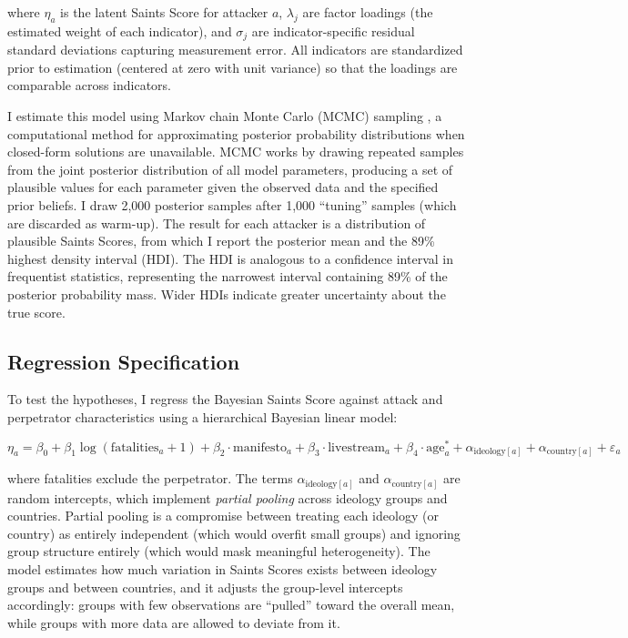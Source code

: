 \documentclass[12pt]{article}
\begin{document}
\noindent where $\eta_a$ is the latent Saints Score for attacker $a$, $\lambda_j$ are factor loadings (the estimated weight of each indicator), and $\sigma_j$ are indicator-specific residual standard deviations capturing measurement error. All indicators are standardized prior to estimation (centered at zero with unit variance) so that the loadings are comparable across indicators.

I estimate this model using Markov chain Monte Carlo (MCMC) sampling \parencite{gelman2013bayesian}, a computational method for approximating posterior probability distributions when closed-form solutions are unavailable. MCMC works by drawing repeated samples from the joint posterior distribution of all model parameters, producing a set of plausible values for each parameter given the observed data and the specified prior beliefs. I draw 2,000 posterior samples after 1,000 ``tuning'' samples (which are discarded as warm-up). The result for each attacker is a distribution of plausible Saints Scores, from which I report the posterior mean and the 89\% highest density interval (HDI). The HDI is analogous to a confidence interval in frequentist statistics, representing the narrowest interval containing 89\% of the posterior probability mass. Wider HDIs indicate greater uncertainty about the true score.

\subsection{Regression Specification}

To test the hypotheses, I regress the Bayesian Saints Score against attack and perpetrator characteristics using a hierarchical Bayesian linear model:

\begin{equation}
\eta_a = \beta_0 + \beta_1 \log(\text{fatalities}_a + 1) + \beta_2 \cdot \text{manifesto}_a + \beta_3 \cdot \text{livestream}_a + \beta_4 \cdot \text{age}_a^{*} + \alpha_{\text{ideology}[a]} + \alpha_{\text{country}[a]} + \varepsilon_a
\end{equation}

\noindent where fatalities exclude the perpetrator. The terms $\alpha_{\text{ideology}[a]}$ and $\alpha_{\text{country}[a]}$ are random intercepts, which implement \textit{partial pooling} across ideology groups and countries. Partial pooling is a compromise between treating each ideology (or country) as entirely independent (which would overfit small groups) and ignoring group structure entirely (which would mask meaningful heterogeneity). The model estimates how much variation in Saints Scores exists between ideology groups and between countries, and it adjusts the group-level intercepts accordingly: groups with few observations are ``pulled'' toward the overall mean, while groups with more data are allowed to deviate from it.
\end{document}
